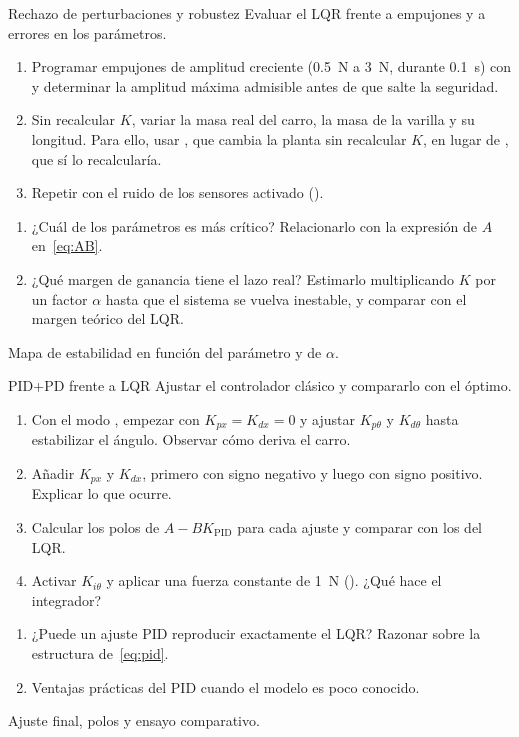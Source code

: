 \begin{practica}{Rechazo de perturbaciones y robustez}
\objetivos Evaluar el LQR frente a empujones y a errores en los parámetros.
\procedimiento
\begin{enumerate}
  \item Programar empujones de amplitud creciente (\SI{0.5}{N} a \SI{3}{N}, durante \SI{0.1}{s}) con  y determinar la amplitud máxima admisible antes de que salte la seguridad.
  \item Sin recalcular $K$, variar la masa real del carro, la masa de la varilla y su longitud. Para ello, usar , que cambia la planta sin recalcular $K$, en lugar de , que sí lo recalcularía.
  \item Repetir con el ruido de los sensores activado ().
\end{enumerate}
\preguntas
\begin{enumerate}
  \item ¿Cuál de los parámetros es más crítico? Relacionarlo con la expresión de $A$ en~\eqref{eq:AB}.
  \item ¿Qué margen de ganancia tiene el lazo real? Estimarlo multiplicando $K$ por un factor $\alpha$ hasta que el sistema se vuelva inestable, y comparar con el margen teórico del LQR.
\end{enumerate}
\entregables Mapa de estabilidad en función del parámetro y de $\alpha$.
\end{practica}

\begin{practica}{PID+PD frente a LQR}
\objetivos Ajustar el controlador clásico y compararlo con el óptimo.
\procedimiento
\begin{enumerate}
  \item Con el modo , empezar con $K_{px}=K_{dx}=0$ y ajustar $K_{p\theta}$ y $K_{d\theta}$ hasta estabilizar el ángulo. Observar cómo deriva el carro.
  \item Añadir $K_{px}$ y $K_{dx}$, primero con signo negativo y luego con signo positivo. Explicar lo que ocurre.
  \item Calcular los polos de $A-BK_{\text{PID}}$ para cada ajuste y comparar con los del LQR.
  \item Activar $K_{i\theta}$ y aplicar una fuerza constante de \SI{1}{N} (). ¿Qué hace el integrador?
\end{enumerate}
\preguntas
\begin{enumerate}
  \item ¿Puede un ajuste PID reproducir exactamente el LQR? Razonar sobre la estructura de~\eqref{eq:pid}.
  \item Ventajas prácticas del PID cuando el modelo es poco conocido.
\end{enumerate}
\entregables Ajuste final, polos y ensayo comparativo.
\end{practica}

